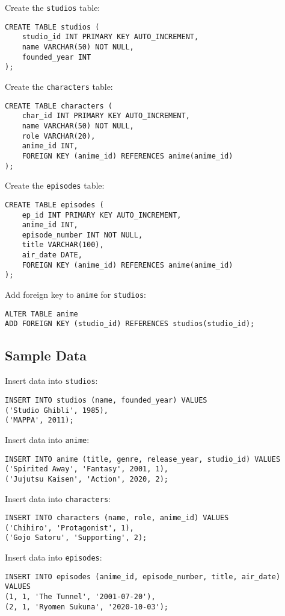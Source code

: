 \documentclass[10pt]{article}
\begin{document}
Create the \texttt{studios} table:
\begin{verbatim}
CREATE TABLE studios (
    studio_id INT PRIMARY KEY AUTO_INCREMENT,
    name VARCHAR(50) NOT NULL,
    founded_year INT
);
\end{verbatim}

Create the \texttt{characters} table:
\begin{verbatim}
CREATE TABLE characters (
    char_id INT PRIMARY KEY AUTO_INCREMENT,
    name VARCHAR(50) NOT NULL,
    role VARCHAR(20),
    anime_id INT,
    FOREIGN KEY (anime_id) REFERENCES anime(anime_id)
);
\end{verbatim}

Create the \texttt{episodes} table:
\begin{verbatim}
CREATE TABLE episodes (
    ep_id INT PRIMARY KEY AUTO_INCREMENT,
    anime_id INT,
    episode_number INT NOT NULL,
    title VARCHAR(100),
    air_date DATE,
    FOREIGN KEY (anime_id) REFERENCES anime(anime_id)
);
\end{verbatim}

Add foreign key to \texttt{anime} for \texttt{studios}:
\begin{verbatim}
ALTER TABLE anime
ADD FOREIGN KEY (studio_id) REFERENCES studios(studio_id);
\end{verbatim}

\subsection{Sample Data}
Insert data into \texttt{studios}:
\begin{verbatim}
INSERT INTO studios (name, founded_year) VALUES
('Studio Ghibli', 1985),
('MAPPA', 2011);
\end{verbatim}

Insert data into \texttt{anime}:
\begin{verbatim}
INSERT INTO anime (title, genre, release_year, studio_id) VALUES
('Spirited Away', 'Fantasy', 2001, 1),
('Jujutsu Kaisen', 'Action', 2020, 2);
\end{verbatim}

Insert data into \texttt{characters}:
\begin{verbatim}
INSERT INTO characters (name, role, anime_id) VALUES
('Chihiro', 'Protagonist', 1),
('Gojo Satoru', 'Supporting', 2);
\end{verbatim}

Insert data into \texttt{episodes}:
\begin{verbatim}
INSERT INTO episodes (anime_id, episode_number, title, air_date) VALUES
(1, 1, 'The Tunnel', '2001-07-20'),
(2, 1, 'Ryomen Sukuna', '2020-10-03');
\end{verbatim}
\end{document}
